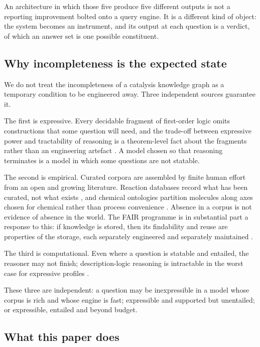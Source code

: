 \documentclass[11pt,twocolumn,a4paper]{article}
\theoremstyle{thmstyle}
\theoremstyle{definition}
\theoremstyle{remark}
\begin{document}
An architecture in which those five produce five different outputs is not a
reporting improvement bolted onto a query engine. It is a different kind of
object: the system becomes an instrument, and its output at each question is a
verdict, of which an answer set is one possible constituent.

\subsection{Why incompleteness is the expected state}

We do not treat the incompleteness of a catalysis knowledge graph as a
temporary condition to be engineered away. Three independent sources guarantee
it.

The first is expressive. Every decidable fragment of first-order logic omits
constructions that some question will need, and the trade-off between
expressive power and tractability of reasoning is a theorem-level fact about
the fragments rather than an engineering artefact
\citep{baader2003,motik2009profiles}. A model chosen so that reasoning
terminates is a model in which some questions are not statable.

The second is empirical. Curated corpora are assembled by finite human effort
from an open and growing literature. Reaction databases record what has been
curated, not what exists \citep{bansal2022,alcantara2012}, and chemical
ontologies partition molecules along axes chosen for chemical rather than
process convenience \citep{hastings2016}. Absence in a corpus is not evidence
of absence in the world. The FAIR programme \citep{wilkinson2016} is in
substantial part a response to this: if knowledge is stored, then its
findability and reuse are properties of the storage, each separately
engineered and separately maintained \citep{gaudet2017}.

The third is computational. Even where a question is statable and entailed,
the reasoner may not finish; description-logic reasoning is intractable in the
worst case for expressive profiles \citep{motik2009hypertableau,glimm2014}.

These three are independent: a question may be inexpressible in a model whose
corpus is rich and whose engine is fast; expressible and supported but
unentailed; or expressible, entailed and beyond budget.

\subsection{What this paper does}
\end{document}
